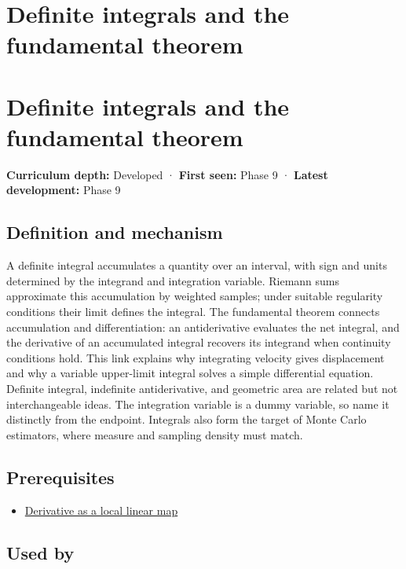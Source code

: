 \hypertarget{appendix-1a50e72435c2}{}
\section*{Definite integrals and the fundamental theorem}
\section{Definite integrals and the fundamental theorem}\label{appendix-1a50e72435c2-definite-integrals-and-the-fundamental-theorem}

\textbf{Curriculum depth:} Developed · \textbf{First seen:} Phase 9 · \textbf{Latest development:} Phase 9

\subsection{Definition and mechanism}\label{appendix-1a50e72435c2-definition-and-mechanism}

A definite integral accumulates a quantity over an interval, with sign and units determined by the integrand and integration variable. Riemann sums approximate this accumulation by weighted samples; under suitable regularity conditions their limit defines the integral. The fundamental theorem connects accumulation and differentiation: an antiderivative evaluates the net integral, and the derivative of an accumulated integral recovers its integrand when continuity conditions hold. This link explains why integrating velocity gives displacement and why a variable upper-limit integral solves a simple differential equation. Definite integral, indefinite antiderivative, and geometric area are related but not interchangeable ideas. The integration variable is a dummy variable, so name it distinctly from the endpoint. Integrals also form the target of Monte Carlo estimators, where measure and sampling density must match.

\subsection{Prerequisites}\label{appendix-1a50e72435c2-prerequisites}

\begin{itemize}
\tightlist
\item
  \hyperref[appendix-7bc181935c42]{Derivative as a local linear map}
\end{itemize}

\subsection{Used by}\label{appendix-1a50e72435c2-used-by}

